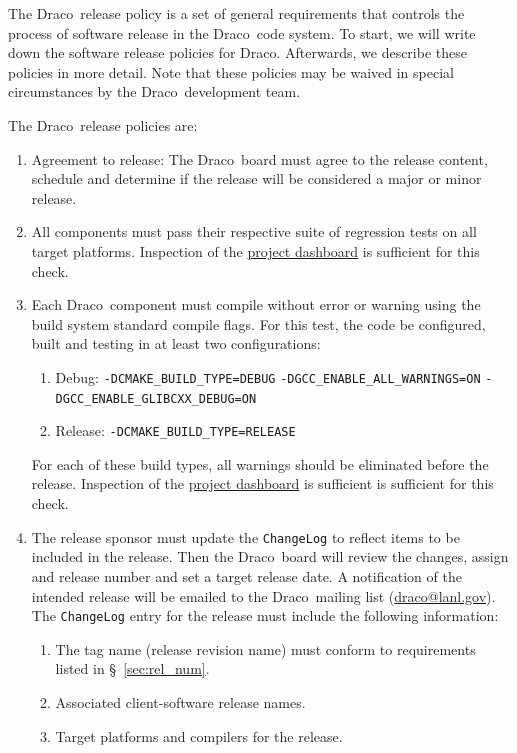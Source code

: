 \documentclass[note]{newmemo}
\newcommand{\draco}{{\normalfont\small\sffamily Draco}}
\begin{document}
The \draco\ release policy is a set of general requirements that
controls the process of software release in the \draco\ code system.
To start, we will write down the software release policies for \draco.
Afterwards, we describe these policies in more detail.  Note that
these policies may be waived in special circumstances by the
\draco\ development team.

The \draco\ release policies are:
\begin{enumerate}
\item Agreement to release: The \draco\ board must agree to the
  release content, schedule and determine if the release will be
  considered a major or minor release.
\item All components must pass their respective suite of regression
  tests on all target platforms.  Inspection of the
  \href{http://coder.lanl.gov/cdash}{project dashboard} is sufficient
  for this check.
\item Each \draco\ component must compile without error or warning
  using the build system standard compile flags.  For this test, the
  code be configured, built and testing in at least two
  configurations:
  \begin{enumerate}
  \item Debug: 
    \texttt{-DCMAKE\_BUILD\_TYPE=DEBUG} 
    \texttt{-DGCC\_ENABLE\_ALL\_WARNINGS=ON} 
    \texttt{-DGCC\_ENABLE\_GLIBCXX\_DEBUG=ON} 
  \item Release: 
    \texttt{-DCMAKE\_BUILD\_TYPE=RELEASE}
  \end{enumerate}
  For each of these build types, all warnings should be eliminated
  before the release.  Inspection of the
  \href{http://coder.lanl.gov/cdash}{project dashboard} is sufficient
  is sufficient for this check.
\item The release sponsor must update the \texttt{ChangeLog} to
  reflect items to be included in the release.  Then the \draco\ board
  will review the changes, assign and release number and set a target
  release date. A notification of the intended release will be emailed
  to the \draco\ mailing list (\url{draco@lanl.gov}).  The
  \texttt{ChangeLog} entry for the release must include the following
  information:
  \begin{enumerate}
    \item The tag name (release revision name) must conform to
      requirements listed in \S~\ref{sec:rel_num}.
    \item Associated client-software release names.
    \item Target platforms and compilers for the release.

\end{enumerate}
\end{enumerate}
\end{document}
